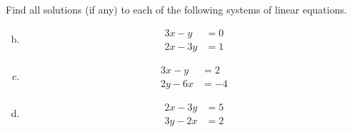 \documentclass[../main.tex]{subfiles}
\begin{document}
\makeatletter
\renewcommand*\env@matrix[1][*\c@MaxMatrixCols c]{%
   \hskip -\arraycolsep
   \let\@ifnextchar\new@ifnextchar
   \array{#1}}
\makeatother

Find all solutions (if any) to each of the following systems of linear equations.
\begin{enumerate}[a)]
	\setcounter{enumi}{1}
	\item 
		\begin{align*}
			3x - y &= 0 \\
			2x - 3y &= 1
		\end{align*}
	\setcounter{enumi}{3}
	\item 
		\begin{align*}
			3x - y &= 2 \\
			2y - 6x &= -4
		\end{align*}
	\setcounter{enumi}{5}
	\item 
		\begin{align*}
			2x - 3y &= 5 \\
			3y - 2x &= 2
		\end{align*}
\end{enumerate}
\end{document}
